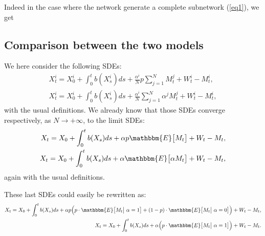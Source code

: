 \documentclass[11pt, a4paper]{article}
\begin{document}
 
Indeed in the case where the network generate a complete subnetwork (\ref{eq1}), we get


\subsection{Comparison between the two models}
We here consider the following SDEs:
\begin{align*}
  X^i_t = X^i_0 + \int_0^t b(X^i_s) ds + \frac{\alpha^i}{N} p \sum_{j = 1}^N M^j_t + W^i_t - M^i_t, \\
  X^i_t = X^i_0 + \int_0^t b(X^i_s) ds + \frac{\alpha^i}{N} \sum_{j = 1}^N \alpha^j M^j_t + W^i_t - M^i_t,
\end{align*}
with the usual definitions. We already know that those SDEs converge respectively, as $N \to +\infty$, to the limit SDEs:
\begin{align*}
  X_t = X_0 + \int_0^t b(X_s) ds + \alpha p \mathbbm{E} \big[ M_t \big] + W_t - M_t, \\
  X_t = X_0 + \int_0^t b(X_s) ds + \alpha \mathbbm{E} \big[ \alpha M_t \big] + W_t - M_t,
\end{align*}
again with the usual definitions.

These last SDEs could easily be rewritten as:
\begin{align*}
  X_t = X_0 + \int_0^t b(X_s) ds + \alpha p \Big( p \cdot \mathbbm{E} \big[ M_t \big| \  \alpha = 1 \big. \big] + (1-p) \cdot \mathbbm{E} \big[ M_t \big| \  \alpha = 0 \big. \big] \Big) + W_t - M_t, \\
  X_t = X_0 + \int_0^t b(X_s) ds + \alpha \Big( p \cdot \mathbbm{E} \big[ M_t \big| \  \alpha = 1 \big. \big] \Big) + W_t - M_t.
\end{align*}
\end{document}
